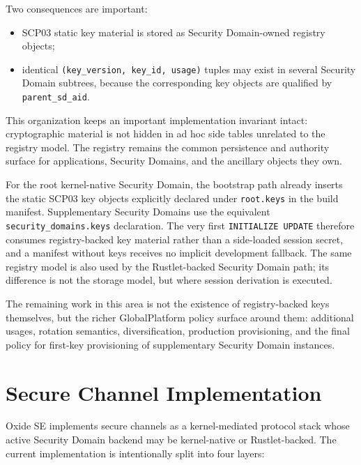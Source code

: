 Two consequences are important:
\begin{itemize}
\item SCP03 static key material is stored as Security Domain-owned registry
      objects;
\item identical \texttt{(key\_version, key\_id, usage)} tuples may exist in
      several Security Domain subtrees, because the corresponding key objects
      are qualified by \texttt{parent\_sd\_aid}.
\end{itemize}

This organization keeps an important implementation invariant intact:
cryptographic material is not hidden in ad hoc side tables unrelated to the
registry model. The registry remains the common persistence and authority
surface for applications, Security Domains, and the ancillary objects they
own.

For the root kernel-native Security Domain, the bootstrap path already inserts
the static SCP03 key objects explicitly declared under \texttt{root.keys} in
the build manifest. Supplementary Security Domains use the equivalent
\texttt{security\_domains.keys} declaration. The very first
\texttt{INITIALIZE UPDATE} therefore consumes registry-backed key material
rather than a side-loaded session secret, and a manifest without keys receives
no implicit development fallback. The same registry model is also used by the
Rustlet-backed Security Domain path; its difference is not the storage model,
but where session derivation is executed.

The remaining work in this area is not the existence of registry-backed keys
themselves, but the richer GlobalPlatform policy surface around them:
additional usages, rotation semantics, diversification, production
provisioning, and the final policy for first-key provisioning of supplementary
Security Domain instances.


\section{Secure Channel Implementation}
\label{sec:impl-scp}

Oxide SE implements secure channels as a kernel-mediated protocol stack whose
active Security Domain backend may be kernel-native or Rustlet-backed. The
current implementation is intentionally split into four layers:

